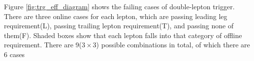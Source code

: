 Figure \ref{fig:trg_eff_diagram} shows the failing cases of double-lepton trigger. 
There are three online cases for each lepton, which are passing leading leg requirement(L), 
passing trailing lepton requirement(T), and passing none of them(F). Shaded boxes 
show that each lepton falls into that category of offline requirement.   
There are 9($3\times3$) possible combinations in total, of which there are 6 cases 
